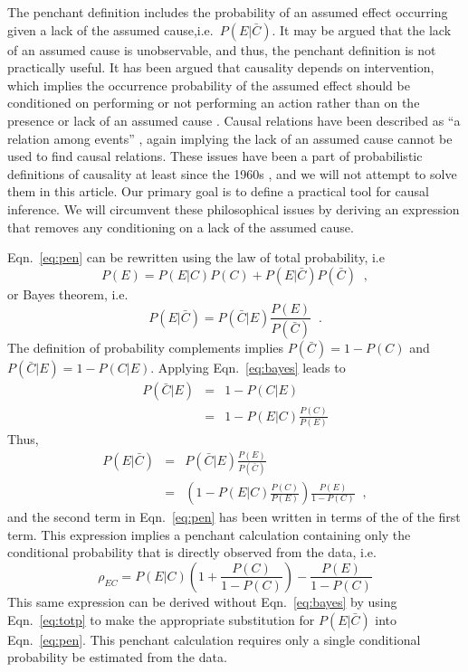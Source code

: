 \documentclass[a4paper,11pt,twocolumn]{article}
\begin{document}
The penchant definition includes the probability of an assumed effect occurring given a lack of the assumed cause,i.e.\ $P(E|\bar{C})$.  It may be argued that the lack of an assumed cause is unobservable, and thus, the penchant definition is not practically useful.  It has been argued that causality depends on intervention, which implies the occurrence probability of the assumed effect should be conditioned on performing or not performing an action rather than on the presence or lack of an assumed cause \cite{Pearl2000}.  Causal relations have been described as ``a relation among events'' \cite{Bunge1979}, again implying the lack of an assumed cause cannot be used to find causal relations.  These issues have been a part of probabilistic definitions of causality at least since the 1960s \cite{Suppes1970}, and we will not attempt to solve them in this article.  Our primary goal is to define a practical tool for causal inference.  We will circumvent these philosophical issues by deriving an expression that removes any conditioning on a lack of the assumed cause.

Eqn.\ \ref{eq:pen} can be rewritten using the law of total probability, i.e
\begin{equation}
\label{eq:totp}
P(E) = P(E|C)P(C) + P(E|\bar{C})P(\bar{C})\;\;,
\end{equation}
or Bayes theorem, i.e.\ 
\begin{equation}
\label{eq:bayes}
P(E|\bar{C}) = P(\bar{C}|E)\frac{P(E)}{P(\bar{C})}\;\;.
\end{equation}
The definition of probability complements implies $P(\bar{C}) = 1-P(C)$ and $P(\bar{C}|E) = 1-P(C|E)$.  Applying Eqn.\ \ref{eq:bayes} leads to
\begin{eqnarray*}
P(\bar{C}|E) &=& 1-P(C|E)\\
&=& 1-P(E|C)\frac{P(C)}{P(E)}
\end{eqnarray*}
Thus,
\begin{eqnarray*}
P(E|\bar{C}) &=& P(\bar{C}|E)\frac{P(E)}{P(\bar{C})}\\
&=&\left(1-P(E|C)\frac{P(C)}{P(E)}\right)\frac{P(E)}{1-P(C)}\;\;,
\end{eqnarray*}
and the second term in Eqn.\ \ref{eq:pen} has been written in terms of the of the first term.  This expression implies a penchant calculation containing only the conditional probability that is directly observed from the data, i.e.\
\begin{equation}
\label{eq:pencal}
\rho_{EC} = P(E|C)\left(1+\frac{P(C)}{1-P(C)}\right)-\frac{P(E)}{1-P(C)}
\end{equation}
This same expression can be derived without Eqn.\ \ref{eq:bayes} by using Eqn.\ \ref{eq:totp} to make the appropriate substitution for $P(E|\bar{C})$ into Eqn.\ \ref{eq:pen}.  This penchant calculation requires only a single conditional probability be estimated from the data.
\end{document}
